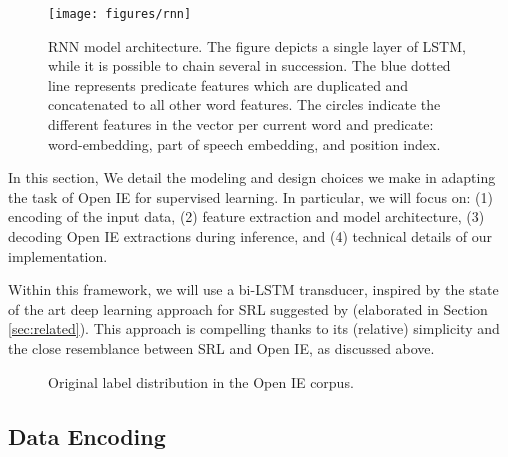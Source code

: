 \begin{figure*}[t!]

  \centering
    \texttt{[image: figures/rnn]}

    \caption{RNN model architecture. The figure depicts a single layer of LSTM, while it is possible to
      chain several in succession. The blue dotted line represents predicate features which are duplicated and concatenated to all other word features. The circles indicate the different features in the vector per current word and predicate: word-embedding, part of speech embedding, and position index.}
  \label{fig:architecture}

\end{figure*}
In this section, We detail the modeling and design choices we make in adapting the task of Open IE for supervised learning.
In particular, we will focus on:
(1) encoding of the input data,
(2) feature extraction and model architecture,
(3) decoding Open IE extractions during inference, and 
(4) technical details of our implementation.

Within this framework, we will use a bi-LSTM transducer, inspired by the state of the art deep learning approach for SRL suggested by  (elaborated in Section \ref{sec:related}).
This approach is compelling thanks to its (relative) simplicity and the close resemblance between SRL and Open IE, as discussed above. 

\begin{figure}[t!]
\centering
  \begin{scalebox}{0.9}{
}
\end{scalebox}
\caption{Original label distribution in the Open IE corpus.}
\label{fig:orig_label_dist}
\end{figure}


\subsection{Data Encoding}
\label{sec:encoding}

